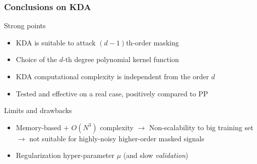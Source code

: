 \begin{frame}
\frametitle{Conclusions on KDA}
\begin{block}{Strong points}
\begin{itemize}
\item KDA is suitable to attack $(d-1)$th-order masking
\item Choice of the $d$-th degree polynomial kernel function
\item KDA computational complexity is independent from the order $d$
\item Tested and effective on a real case, positively compared to PP 
\end{itemize}
\end{block}

\begin{block}{Limits and drawbacks}
\begin{itemize}
\item Memory-based $+$ $O(N^3)$ complexity $\rightarrow$ Non-scalability to big training set $\rightarrow$ not suitable for highly-noisy higher-order masked signals
\item Regularization hyper-parameter $\mu$ (and slow \emph{validation})
\end{itemize}
\end{block}

\end{frame}